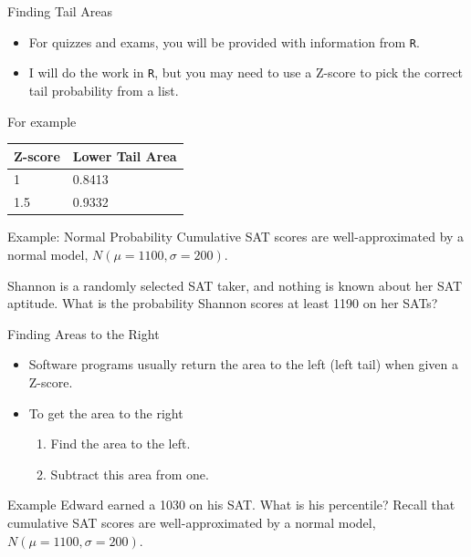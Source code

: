 \begin{frame}{Finding Tail Areas}
    \begin{itemize}
        \item For quizzes and exams, you will be provided with information from \texttt{R}. 
        \item I will do the work in \texttt{R}, but you may need to use a Z-score to pick the correct tail probability from a list.
    \end{itemize}
    For example
    \begin{center}
        \begin{tabular}{l l}
            \hline
            Z-score & Lower Tail Area \\
            \hline
            1 & 0.8413 \\
            1.5 & 0.9332 \\
            \hline
        \end{tabular}
    \end{center}
\end{frame}

\begin{frame}{Example: Normal Probability}
    Cumulative SAT scores are well-approximated by a normal model, $N (\mu = 1100, \sigma = 200)$.
    
    \vspace{12pt}Shannon is a randomly selected SAT taker, and nothing is known about her SAT aptitude. What is the probability Shannon scores at least 1190 on her SATs?
\end{frame}

\begin{frame}{Finding Areas to the Right}
    \begin{itemize}
        \item Software programs usually return the area to the left (left tail) when given a Z-score.
        \item To get the area to the right
        \begin{enumerate}
            \item Find the area to the left.
            \item Subtract this area from one.
        \end{enumerate}
    \end{itemize}
\end{frame}

\begin{frame}{Example}
    Edward earned a 1030 on his SAT. What is his percentile? Recall that cumulative SAT scores are well-approximated by a normal model, $N (\mu = 1100, \sigma = 200)$. 
\end{frame}

